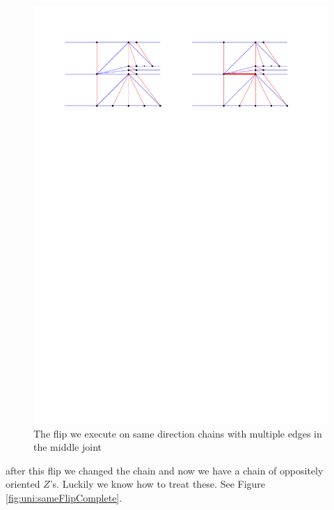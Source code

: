 \begin{figure}[h]
  \centering
  \includegraphics[width =\textwidth]{unifiedAlgo/img/post/sameMultiFlip}
  \caption{The flip we execute on same direction chains with multiple edges in the middle joint}
  \label{fig:uni:sameMultiFlip}
\end{figure}

 after this flip we changed the chain and now we have a chain of oppositely oriented $Z$'s. Luckily we know how to treat these. See Figure \ref{fig:uni:sameFlipComplete}.

